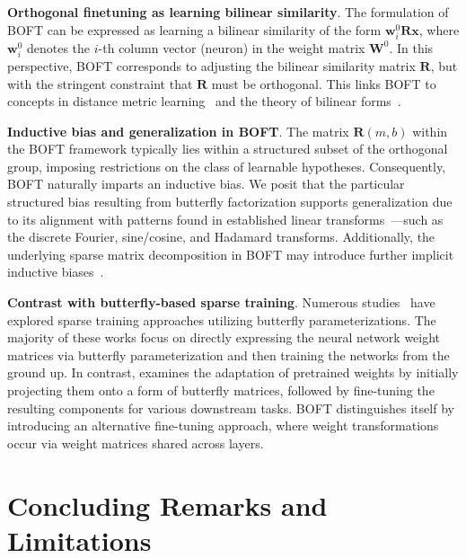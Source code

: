 \textbf{Orthogonal finetuning as learning bilinear similarity}. The formulation of BOFT can be expressed as learning a bilinear similarity of the form $\bm{w}^0_i\bm{R}\bm{x}$, where $\bm{w}^0_i$ denotes the $i$-th column vector (neuron) in the weight matrix $\bm{W}^0$. In this perspective, BOFT corresponds to adjusting the bilinear similarity matrix $\bm{R}$, but with the stringent constraint that $\bm{R}$ must be orthogonal. This links BOFT to concepts in distance metric learning~\cite{xing2002distance} and the theory of bilinear forms~\cite{roman2005advanced}.

\textbf{Inductive bias and generalization in BOFT}. The matrix $\bm{R}(m,b)$ within the BOFT framework typically lies within a structured subset of the orthogonal group, imposing restrictions on the class of learnable hypotheses. Consequently, BOFT naturally imparts an inductive bias. We posit that the particular structured bias resulting from butterfly factorization supports generalization due to its alignment with patterns found in established linear transforms~\cite{dao2019kaleidoscope}—such as the discrete Fourier, sine/cosine, and Hadamard transforms. Additionally, the underlying sparse matrix decomposition in BOFT may introduce further implicit inductive biases~\cite{gunasekar2017implicit,li2018algorithmic,liu2019neural}.

\textbf{Contrast with butterfly-based sparse training}. Numerous studies~\cite{dao2019learning,dao2019kaleidoscope,chen2022pixelated,dao2022monarch} have explored sparse training approaches utilizing butterfly parameterizations. The majority of these works focus on directly expressing the neural network weight matrices via butterfly parameterization and then training the networks from the ground up. In contrast, \cite{dao2022monarch} examines the adaptation of pretrained weights by initially projecting them onto a form of butterfly matrices, followed by fine-tuning the resulting components for various downstream tasks. BOFT distinguishes itself by introducing an alternative fine-tuning approach, where weight transformations occur via weight matrices shared across layers.



\section{Concluding Remarks and Limitations}

